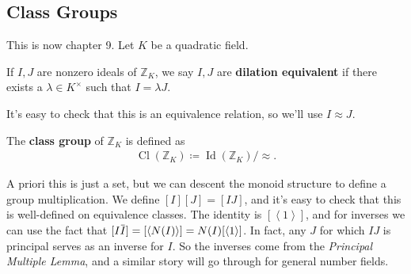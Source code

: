 \hypertarget{class-groups}{%
\subsection{Class Groups}\label{class-groups}}

\begin{remark}

This is now chapter 9. Let \(K\) be a quadratic field.

\end{remark}

\begin{definition}

If \(I, J\) are nonzero ideals of \({\mathbb{Z}}_K\), we say \(I, J\)
are \textbf{dilation equivalent} if there exists a
\(\lambda\in K^{\times}\) such that \(I = \lambda J\).

\end{definition}

\begin{remark}

It's easy to check that this is an equivalence relation, so we'll use
\(I \approx J\).

\end{remark}

\begin{definition}

The \textbf{class group} of \({\mathbb{Z}}_K\) is defined as
\begin{align*}
\operatorname{Cl}({\mathbb{Z}}_K) \coloneqq\operatorname{Id}({\mathbb{Z}}_K)/\approx
.\end{align*}

\end{definition}

\begin{remark}

A priori this is just a set, but we can descent the monoid structure to
define a group multiplication. We define \([I] [J] = [IJ]\), and it's
easy to check that this is well-defined on equivalence classes. The
identity is \([ \left\langle{ 1 }\right\rangle]\), and for inverses we
can use the fact that
\([I \mkern 1.5mu\overline{\mkern-1.5muI\mkern-1.5mu}\mkern 1.5mu] = [\left\langle{ N(I) }\right\rangle] = N(I) [ \left\langle{ 1 }\right\rangle ]\).
In fact, any \(J\) for which \(IJ\) is principal serves as an inverse
for \(I\). So the inverses come from the \emph{Principal Multiple
Lemma}, and a similar story will go through for general number fields.

\end{remark}

